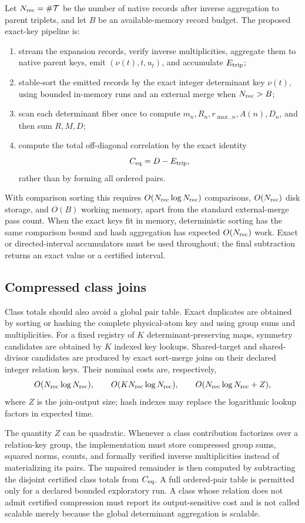 Let \(N_{\rm rec}=\#\mathcal T\) be the number of native records after inverse
aggregation to parent triplets, and let \(B\) be an available-memory
record budget.  The proposed exact-key pipeline is:
\begin{enumerate}[leftmargin=2.2em]
 \item stream the expansion records, verify inverse multiplicities,
 aggregate them to native parent keys, emit
 \((\nu(t),t,u_t)\), and accumulate \(E_{\mathrm{trip}}\);
 \item stable-sort the emitted records by the exact integer
 determinant key \(\nu(t)\), using bounded in-memory runs and an
 external merge when \(N_{\rm rec}>B\);
 \item scan each determinant fiber once to compute
 \(m_n,R_n,r_{\max,n},A(n),D_n\), and then sum \(R,M,D\);
 \item compute the total off-diagonal correlation by the exact
 identity
 \[
  C_{\mathrm{eq}}=D-E_{\mathrm{trip}},
 \]
 rather than by forming all ordered pairs.
\end{enumerate}
With comparison sorting this requires
\(O(N_{\rm rec}\log N_{\rm rec})\) comparisons,
\(O(N_{\rm rec})\) disk storage, and \(O(B)\) working memory, apart
from the standard external-merge pass count.  When the exact keys fit
in memory, deterministic sorting has the same comparison bound and
hash aggregation has expected \(O(N_{\rm rec})\) work.  Exact or
directed-interval accumulators must be used throughout; the final
subtraction returns an exact value or a certified interval.

\subsection{Compressed class joins}

Class totals should also avoid a global pair table.  Exact duplicates
are obtained by sorting or hashing the complete physical-atom key and
using group sums and multiplicities.  For a fixed registry of
\(K\) determinant-preserving maps, symmetry candidates are obtained
by \(K\) indexed key lookups.  Shared-target and shared-divisor
candidates are produced by exact sort-merge joins on their declared
integer relation keys.  Their nominal costs are, respectively,
\[
 O(N_{\rm rec}\log N_{\rm rec}),\qquad
 O(KN_{\rm rec}\log N_{\rm rec}),\qquad
 O(N_{\rm rec}\log N_{\rm rec}+Z),
\]
where \(Z\) is the join-output size; hash indexes may replace the
logarithmic lookup factors in expected time.

The quantity \(Z\) can be quadratic.  Whenever a class contribution
factorizes over a relation-key group, the implementation must store
compressed group sums, squared norms, counts, and formally verified
inverse multiplicities instead of materializing its pairs.  The
unpaired remainder is then computed by subtracting the disjoint
certified class totals from \(C_{\mathrm{eq}}\).  A full ordered-pair table
is permitted only for a declared bounded exploratory run.  A class
whose relation does not admit certified compression must report its
output-sensitive cost and is not called scalable merely because the
global determinant aggregation is scalable.

